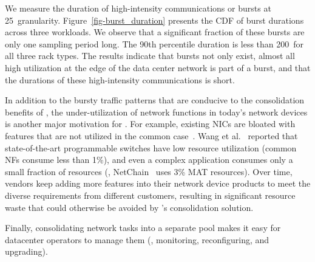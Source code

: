 We measure the duration of high-intensity communications or bursts at 25\mus\ granularity.
Figure~\ref{fig-burst_duration} presents the CDF of burst durations across three workloads.  We observe that a significant fraction of these bursts are only one sampling period long. The 90th percentile duration is less than 200\mus\ for all three rack types.
The results indicate that bursts not only exist, almost all high utilization at the edge of the data center network is part of a burst, and that the durations of these high-intensity communications is short.
\fi

In addition to the bursty traffic patterns that are conducive to the consolidation benefits of \sysname,
the under-utilization of network functions in today's network devices is another major motivation for \sysname. 
For example, existing NICs are bloated with features that are not utilized in the common case~\cite{SmartNIC-nsdi18,Caulfield-2018}. 
Wang et al.~\cite{Wang-HotCloud20} reported that state-of-the-art programmable switches have low resource utilization (common NFs consume less than 1\%), 
and even a complex application consumes only a small fraction of resources (\eg, NetChain~\cite{netchain-nsdi18} uses 3\% MAT resources). 
Over time, vendors keep adding more features into their network device products to meet the diverse requirements from different customers, resulting in significant resource waste that could otherwise be avoided by \sysname's consolidation solution. 

Finally, consolidating network tasks into a separate pool makes it easy for datacenter operators to manage them (\eg, monitoring, reconfiguring, and upgrading).




